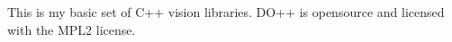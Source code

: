 This is my basic set of C++ vision libraries. D\-O++ is opensource and licensed with the M\-P\-L2 license. 